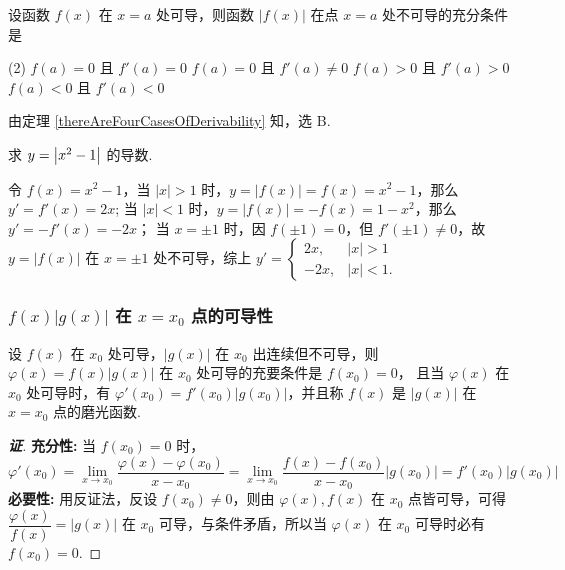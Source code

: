 \begin{example}[2000 数三]
    设函数 $f(x)$ 在 $x=a$ 处可导，则函数 $|f(x)|$ 在点 $x=a$ 处不可导的充分条件是
    \begin{tasks}(2)
        \task $f(a)=0$ 且 $f'(a)=0$
        \task $f(a)=0$ 且 $f'(a)\not=0$
        \task $f(a)>0$ 且 $f'(a)>0$
        \task $f(a)<0$ 且 $f'(a)<0$
    \end{tasks}
\end{example}
\begin{solution}
    由定理 \ref{thereAreFourCasesOfDerivability} 知，选 B.
\end{solution}

\begin{example}
    求 $y=\qty|x^2-1|$ 的导数.
\end{example}
\begin{solution}
    令 $f(x)=x^2-1$，当 $ |x|>1 $ 时，$y=|f(x)|=f(x)=x^2-1$，那么 $y'=f'(x)=2x$; 当 $|x|<1$ 时，$y=|f(x)|=-f(x)=1-x^2$，那么 $y'=-f'(x)=-2x$；
    当 $x=\pm 1$ 时，因 $f(\pm 1)=0$，但 $f'(\pm 1)\neq0$，故 $y=|f(x)|$ 在 $x=\pm1$ 处不可导，综上 $y'=\begin{cases}
        2x,&|x|>1\\-2x,&|x|<1.
    \end{cases}$
\end{solution}

\subsubsection{\texorpdfstring{$f(x)|g(x)|$}. 在 \texorpdfstring{$x=x_0$}. 点的可导性}

\begin{theorem}
    \label{hanshukedaoxing}
    设 $f(x)$ 在 $x_0$ 处可导，$|g(x)|$ 在 $x_0$ 出连续但不可导，则 $\varphi (x)=f(x)|g(x)|$ 在 $x_0$ 处可导的充要条件是 $f(x_0)=0$，
    且当 $\varphi(x)$ 在 $x_0$ 处可导时，有 $\varphi'(x_0)=f'(x_0)|g(x_0)|$，并且称 $f(x)$ 是 $|g(x)|$ 在 $x=x_0$ 点的磨光函数.
\end{theorem}
\begin{proof}[{\songti \textbf{证}}]
    \textbf{充分性: }当 $f(x_0)=0$ 时，$$ \varphi'(x_0)=\lim_{x\to x_0}\dfrac{\varphi (x)-\varphi(x_0)}{x-x_0}=\lim_{x\to x_0}\dfrac{f(x)-f(x_0)}{x-x_0}|g(x_0)|=f'(x_0)|g(x_0)| $$
    \textbf{必要性: }用反证法，反设 $f(x_0)\neq 0$，则由 $\varphi(x),f(x)$ 在 $x_0$ 点皆可导，可得 $\dfrac{\varphi(x)}{f(x)}=|g(x)|$ 在 $x_0$ 可导，与条件矛盾，所以当 $\varphi(x)$ 在 $x_0$ 可导时必有 $f(x_0)=0.$
\end{proof}

